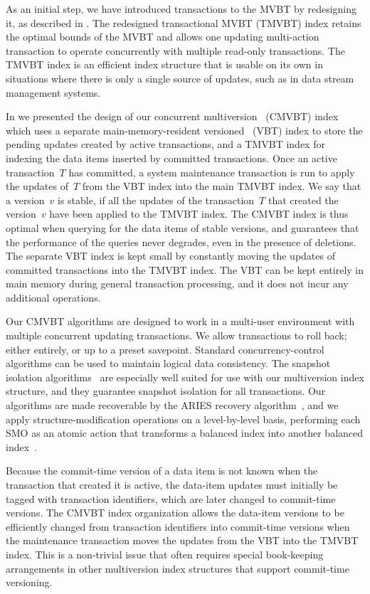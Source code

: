 As an initial step, we have introduced transactions to the MVBT by
redesigning it, as described in .
The redesigned transactional MVBT (TMVBT) index retains the optimal bounds of
the MVBT and allows one updating multi-action transaction to operate
concurrently with multiple read-only transactions.
The TMVBT index is an efficient index structure that is usable on its own in
situations where there is only a single source of updates, such as in data
stream management systems.

In  we presented the design of our concurrent
multiversion \Btree\ (CMVBT) index which uses a separate main-memory-resident 
versioned \Btree~(VBT) index to store the pending updates created by active
transactions, and a TMVBT index for indexing the data items inserted by
committed transactions.
Once an active transaction~$T$ has committed, a system maintenance
transaction is run to apply the updates of~$T$ from the VBT index
into the main TMVBT index.
We say that a version~$v$ is stable, if all the updates of the
transaction~$T$ that created the version~$v$ have been applied to the TMVBT
index.
The CMVBT index is thus optimal when querying for the data items of 
stable versions, and guarantees that the performance of the queries never
degrades, even in the presence of deletions.
The separate VBT index is kept small by constantly moving the
updates of committed transactions into the TMVBT index.
The VBT can be kept entirely in main memory during general transaction
processing, and it does not incur any additional  operations.

Our CMVBT algorithms are designed to work in a multi-user environment with
multiple concurrent updating transactions. 
We allow transactions to roll back; either entirely, or up to a preset 
savepoint.
Standard concurrency-control algorithms can be used to maintain logical
data consistency.
The snapshot isolation
algorithms~\cite{berenson:1995:sql-critique}
are especially well suited for use with our multiversion index
structure, and they guarantee snapshot isolation for all transactions. 
Our algorithms are made recoverable by the ARIES recovery
algorithm~\cite{mohan:1992:aries,mohan:1992:aries-im}, and we apply
structure-modification operations on a level-by-level basis, performing each
SMO as an atomic action that transforms a balanced index into another
balanced
index~\cite{jaluta:2003:recoverable,jaluta:2005:blink,jaluta:2006:page-server}.

Because the commit-time version of a data item is not known when the
transaction that created it is active, the data-item updates must
initially be tagged with transaction identifiers, which are later 
changed to commit-time versions.
The CMVBT index organization allows the data-item versions to be efficiently
changed from transaction identifiers into commit-time versions when the 
maintenance transaction moves the updates from the VBT into the TMVBT index.
This is a non-trivial issue that often requires special book-keeping
arrangements in other multiversion index structures that support
commit-time versioning.

